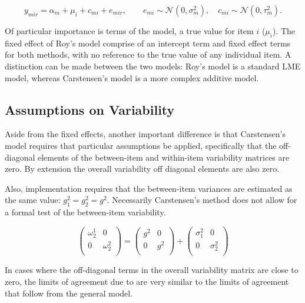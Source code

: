 \documentclass[12pt, a4paper]{report}
\theoremstyle{plain}
\theoremstyle{definition}
\theoremstyle{remark}
\begin{document}
	\begin{equation}
	y_{mir}  = \alpha_{m} + \mu_{i} + c_{mi} + e_{mir}, \qquad  e_{mi}
	\sim \mathcal{N}(0,\sigma^{2}_{m}), \quad c_{mi} \sim \mathcal{N}(0,\tau^{2}_{m}).
	\end{equation}
	
	Of particular importance is terms of the model, a true value for item $i$ ($\mu_{i}$).  The fixed effect of Roy's model comprise of an intercept term and fixed effect terms for both methods, with no reference to the true value of any individual item. A distinction can be made between the two models: Roy's model is a standard LME model, whereas Carstensen's model is a more complex additive model.
	
	
	\subsection{Assumptions on Variability}
	
	Aside from the fixed effects, another important difference is that Carstensen's model requires that particular assumptions be applied, specifically that the off-diagonal elements of the between-item
	and within-item variability matrices are zero. By extension the
	overall variability off diagonal elements are also zero.
	
	Also, implementation requires that the between-item variances are
	estimated as the same value: $g^2_1 = g^2_2 = g^2$. Necessarily
	Carstensen's method does not allow for a formal test of the
	between-item variability.
	
	\[\left(\begin{array}{cc}
	\omega^1_2  & 0 \\
	0 & \omega^2_2 \\
	\end{array}  \right)
	=  \left(
	\begin{array}{cc}
	g^2  & 0 \\
	0 & g^2 \\
	\end{array} \right)+
	\left(
	\begin{array}{cc}
	\sigma^2_1  & 0 \\
	0 & \sigma^2_2 \\
	\end{array}\right)
	\]
	
	In cases where the off-diagonal terms in the overall variability
	matrix are close to zero, the limits of agreement due to
	\citet{bxc2008} are very similar to the limits of agreement that
	follow from the general model.
	
\end{document}

